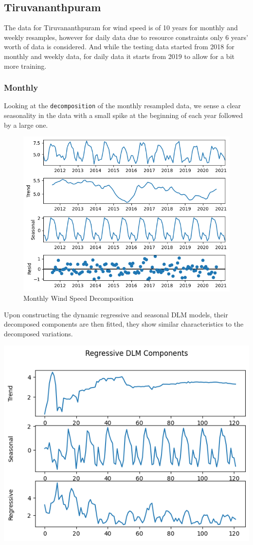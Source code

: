 \documentclass[a4paper,12pt]{article}
\begin{document}
\subsection{Tiruvananthpuram}
\label{sec:org6be26f3}
The data for Tiruvananthpuram for wind speed is of 10 years for monthly and weekly resamples, however for daily data due to resource constraints only 6 years' worth of data is considered. And while the testing data started from 2018 for monthly and weekly data, for daily data it starts from 2019 to allow for a bit more training.
\subsubsection{Monthly}
\label{sec:org0d54bd9}
Looking at the \texttt{decomposition} of the monthly resampled data, we sense a clear seasonality in the data with a small spike at the beginning of each year followed by a large one.

\begin{figure}[htbp]
\centering
\includegraphics[width=1.00\textwidth]{./images/tiru/monthlyDecomp.png}
Monthly Wind Speed Decomposition
\end{figure}

Upon constructing the dynamic regressive and seasonal DLM models, their decomposed components are then fitted, they show similar characteristics to the decomposed variations.

\begin{center}
\includegraphics[width=0.7\linewidth]{./images/tiru/monthlyRegDecomp.png}
\end{center}
\end{document}
